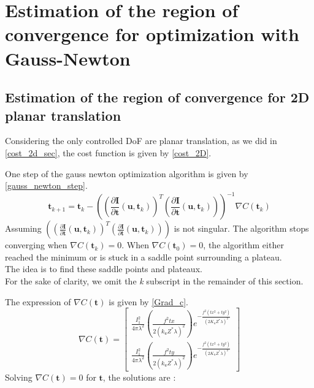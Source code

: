 \section{Estimation of the region of convergence for optimization with Gauss-Newton}\label{Gauss_newto_secn}
\subsection{Estimation of the region of convergence for 2D planar translation}
Considering the only controlled DoF are planar translation, as we did in \ref{cost_2d_sec}, the cost function is given by \eqref{cost_2D}.
\par One step of the gauss newton optimization algorithm is given by \eqref{gauss_newton_step}.
\begin{equation}
    \textbf{t}_{k+1} = \textbf{t}_{k} - \left(\left(\frac{\partial \textbf{I}}{\partial \textbf{t}}(\textbf{u},\textbf{t}_{k})\right)^{T}\left(\frac{\partial \textbf{I}}{\partial\textbf{t}}(\textbf{u},\textbf{t}_{k})\right)\right)^{-1}\nabla C(\textbf{t}_{k})
    \label{gauss_newton_step}
\end{equation}
Assuming $\left(\left(\frac{\partial \textbf{I}}{\partial \textbf{t}}(\textbf{u},\textbf{t}_{k})\right)^{T}\left(\frac{\partial \textbf{I}}{\partial\textbf{t}}(\textbf{u},\textbf{t}_{k})\right)\right)$ is not singular. The algorithm stops converging when $\nabla C(\textbf{t}_{k}) = 0$.
When $\nabla C(\textbf{t}_{0}) = 0$, the algorithm either reached the minimum or is stuck in a saddle point surrounding a plateau. \\ The idea is to find these saddle points and plateaux.
\\For the sake of clarity, we omit the \textit{k} subscript in the remainder of this section.
\par The expression of $\nabla C(\textbf{t})$ is given by \eqref{Grad_c}.
\begin{equation}
    \nabla C(\textbf{t}) = \begin{bmatrix}
        \frac{I_{1}^{2}}{4\pi\lambda^{2}}\left(\frac{f^{2}tx}{2(k_{u}Z^{*}\lambda)^{2}}\right)e^{-\frac{f^{2}\left(tx^{2}+ty^{2}\right)}{(2K_{u}Z^{*}\lambda)^{2}}}\\
         \frac{I_{1}^{2}}{4\pi\lambda^{2}}\left(\frac{f^{2}ty}{2(k_{u}Z^{*}\lambda)^{2}}\right)e^{-\frac{f^{2}\left(tx^{2}+ty^{2}\right)}{(2K_{u}Z^{*}\lambda)^{2}}}                 
                    \end{bmatrix}
    \label{Grad_c}
\end{equation}
Solving $\nabla C(\textbf{t}) = 0$ for $\textbf{t}$, the solutions are :

